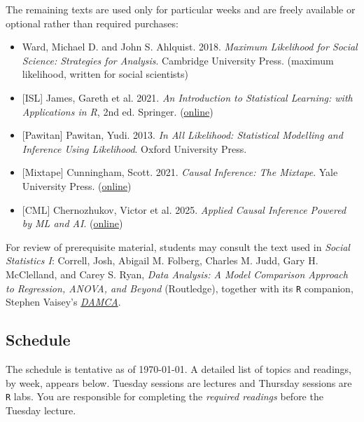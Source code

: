 \documentclass[12pt]{article}
\begin{document}
\vspace{0.5em}

\noindent The remaining texts are used only for particular weeks and are freely available or optional rather than required purchases:

\begin{itemize}[noitemsep]
    \item Ward, Michael D. and John S. Ahlquist. 2018. \textit{Maximum Likelihood for Social Science: Strategies for Analysis}. Cambridge University Press. (maximum likelihood, written for social scientists)
    \item \textcolor{titlecolor}{[ISL]} James, Gareth et al. 2021. \textit{An Introduction to Statistical Learning: with Applications in R}, 2nd ed. Springer. (\href{https://www.statlearning.com/}{online})
    \item \textcolor{titlecolor}{[Pawitan]} Pawitan, Yudi. 2013. \textit{In All Likelihood: Statistical Modelling and Inference Using Likelihood}. Oxford University Press.
    \item \textcolor{titlecolor}{[Mixtape]} Cunningham, Scott. 2021. \textit{Causal Inference: The Mixtape}. Yale University Press. (\href{https://mixtape.scunning.com/}{online})
    \item \textcolor{titlecolor}{[CML]} Chernozhukov, Victor et al. 2025. \textit{Applied Causal Inference Powered by ML and AI}. (\href{https://causalml-book.org/}{online})
\end{itemize}

For review of prerequisite material, students may consult the text used in \textit{Social Statistics I}: Correll, Josh, Abigail M. Folberg, Charles M. Judd, Gary H. McClelland, and Carey S. Ryan, \textit{Data Analysis: A Model Comparison Approach to Regression, ANOVA, and Beyond} (Routledge), together with its \texttt{R} companion, Stephen Vaisey's \href{https://vaiseys.github.io/damca/}{\textit{DAMCA}}.

\subsection*{Schedule}

The schedule is tentative as of \today. A detailed list of topics and readings, by week, appears below. Tuesday sessions are lectures and Thursday sessions are \texttt{R} labs. You are responsible for completing the \textit{required readings} before the Tuesday lecture.

\vspace{0.5em}
\end{document}
